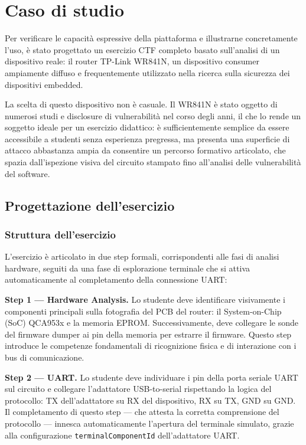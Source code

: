 \chapter{Caso di studio}
\label{ch:caso-di-studio}

Per verificare le capacità espressive della piattaforma e illustrarne concretamente l'uso, è stato progettato un esercizio CTF completo basato sull'analisi di un dispositivo reale: il router TP-Link WR841N, un dispositivo consumer ampiamente diffuso e frequentemente utilizzato nella ricerca sulla sicurezza dei dispositivi embedded.

La scelta di questo dispositivo non è casuale. Il WR841N è stato oggetto di numerosi studi e disclosure di vulnerabilità nel corso degli anni, il che lo rende un soggetto ideale per un esercizio didattico: è sufficientemente semplice da essere accessibile a studenti senza esperienza pregressa, ma presenta una superficie di attacco abbastanza ampia da consentire un percorso formativo articolato, che spazia dall'ispezione visiva del circuito stampato fino all'analisi delle vulnerabilità del software.


\section{Progettazione dell'esercizio}
\label{sec:progettazione-esercizio}

\subsection{Struttura dell'esercizio}
\label{subsec:struttura-esercizio}

L'esercizio è articolato in due step formali, corrispondenti alle fasi di analisi hardware, seguiti da una fase di esplorazione terminale che si attiva automaticamente al completamento della connessione UART:

\textbf{Step 1 --- Hardware Analysis.} Lo studente deve identificare visivamente i componenti principali sulla fotografia del PCB del router: il System-on-Chip (SoC) QCA953x e la memoria EPROM. Successivamente, deve collegare le sonde del firmware dumper ai pin della memoria per estrarre il firmware. Questo step introduce le competenze fondamentali di ricognizione fisica e di interazione con i bus di comunicazione.

\textbf{Step 2 --- UART.} Lo studente deve individuare i pin della porta seriale UART sul circuito e collegare l'adattatore USB-to-serial rispettando la logica del protocollo: TX dell'adattatore su RX del dispositivo, RX su TX, GND su GND. Il completamento di questo step --- che attesta la corretta comprensione del protocollo --- innesca automaticamente l'apertura del terminale simulato, grazie alla configurazione \texttt{terminalComponentId} dell'adattatore UART.

